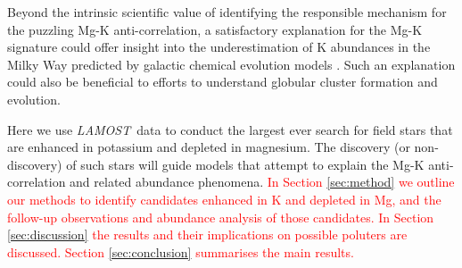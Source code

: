 \documentclass[a4paper,fleqn,usenatbib]{mnras}
\newcommand{\todo}[1]{\textcolor{red}{#1}}
\newcommand{\LamostGiants}{454180}
\newcommand{\project}[1]{\emph{#1}}
\newcommand{\lamost}{\project{LAMOST}}
\begin{document}

Beyond the intrinsic scientific value of identifying the responsible mechanism for the puzzling Mg-K anti-correlation, a satisfactory explanation for the Mg-K signature could offer insight into the underestimation of K abundances in the Milky Way predicted by galactic chemical evolution models \citep{kobayashi2011}. Such an explanation could also be beneficial to efforts to understand globular cluster formation and evolution.

Here we use \lamost\ data to conduct the largest ever search for field stars that are enhanced in potassium and depleted in magnesium. The discovery (or non-discovery) of such stars will guide models that attempt to explain the Mg-K anti-correlation and related abundance phenomena.\todo{ In Section \ref{sec:method} we outline our methods to identify candidates enhanced in K and depleted in Mg, and the follow-up observations and abundance analysis of those candidates. In Section \ref{sec:discussion} the results and their implications on possible poluters are discussed. Section \ref{sec:conclusion} summarises the main results.}


\end{document}
